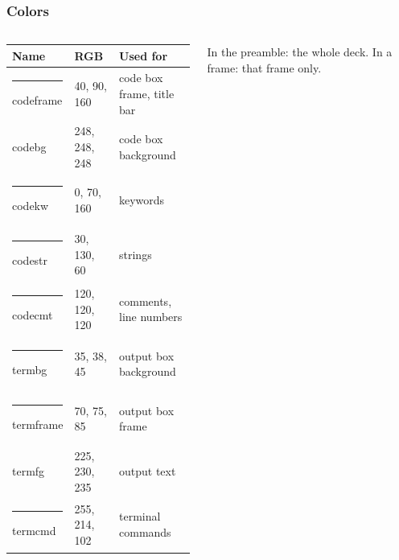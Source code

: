 \documentclass[aspectratio=169,10pt,compress]{beamer}
\begin{document}
\begin{frame}[t,fragile] \frametitle{Colors}
	\begin{columns}[T]
		\begin{column}{0.50\textwidth}

\begin{table}
		\scriptsize
		\begin{tabular}{@{}L{0.28\textwidth}L{0.22\textwidth}L{0.36\textwidth}@{}}
			\toprule
			\textbf{Name} & \textbf{RGB} & \textbf{Used for} \\
			\midrule
			\textcolor{codeframe}{\rule{6pt}{6pt}} codeframe & 40, 90, 160    & code box frame, title bar \\
			 codebg & 248, 248, 248 & code box background \\
			\textcolor{codekw}{\rule{6pt}{6pt}} codekw       & 0, 70, 160     & keywords \\
			\textcolor{codestr}{\rule{6pt}{6pt}} codestr     & 30, 130, 60    & strings \\
			\textcolor{codecmt}{\rule{6pt}{6pt}} codecmt     & 120, 120, 120  & comments, line numbers \\
			\textcolor{termbg}{\rule{6pt}{6pt}} termbg       & 35, 38, 45     & output box background \\
			\textcolor{termframe}{\rule{6pt}{6pt}} termframe & 70, 75, 85     & output box frame \\
			 termfg & 225, 230, 235  & output text \\
			\textcolor{termcmd}{\rule{6pt}{6pt}} termcmd     & 255, 214, 102  & terminal commands \\
			\bottomrule
		\end{tabular}
\end{table}%

		\end{column}
		\begin{column}{0.46\textwidth}

\begin{texcode}
\end{texcode}

			{
			}

			\footnotesize In the preamble: the whole deck. In a frame: that frame only.
		\end{column}
	\end{columns}
\end{frame}
\end{document}
